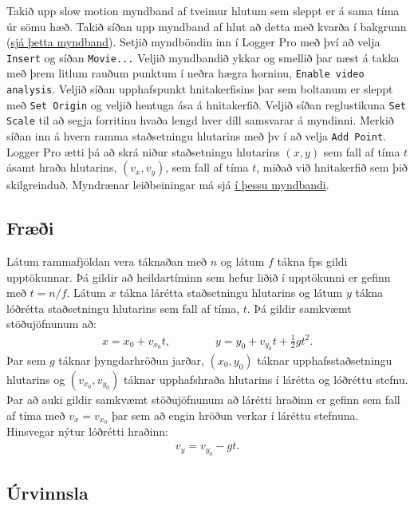 \documentclass[oneside]{book}
\theoremstyle{definition}
\begin{document}
Takið upp slow motion myndband af tveimur hlutum sem sleppt er á sama tíma úr sömu hæð. Takið síðan upp myndband af hlut að detta með kvarða í bakgrunn (\href{https://www.dropbox.com/s/k13yf25p9ocxt9y/IMG_0976.MOV?dl=1}{sjá þetta myndband}). Setjið myndböndin inn í Logger Pro með því að velja \verb|Insert| og síðan \verb|Movie...| 
Veljið myndbandið ykkar og smellið þar næst á takka með þrem litlum rauðum punktum í neðra hægra horninu, \verb|Enable video analysis|. Veljið síðan upphafspunkt hnitakerfisins þar sem boltanum er sleppt með \verb|Set Origin| og veljið hentuga ása á hnitakerfið. Veljið síðan reglustikuna \verb|Set Scale| til að segja forritinu hvaða lengd hver díll samsvarar á myndinni. Merkið síðan inn á hvern ramma staðsetningu hlutarins með þv
í að velja \verb|Add Point|. Logger Pro ætti þá að skrá niður staðsetningu hlutarins $(x,y)$ sem fall af tíma $t$ ásamt hraða hlutarins, $(v_x, v_y)$, sem fall af tíma $t$,  miðað við hnitakerfið sem þið skilgreinduð. Myndrænar leiðbeiningar má sjá \href{https://youtu.be/rwYJV8W5_64}{í þessu myndbandi}.


\subsection*{Fræði}

Látum rammafjöldan vera táknaðan með $n$ og látum $f$ tákna fps gildi upptökunnar. Þá gildir að heildartíminn sem hefur liðið í upptökunni er gefinn með $t = n/f$. Látum $x$ tákna lárétta staðsetningu hlutarins og látum $y$ tákna lóðrétta staðsetningu hlutarins sem fall af tíma, $t$. Þá gildir samkvæmt stöðujöfnunum að:
\begin{align}
    x = x_0 + v_{x_{0}}t, \qquad \qquad y = y_0 + v_{y_{0}} t + \frac{1}{2}gt^2.
\end{align}
Þar sem $g$ táknar þyngdarhröðun jarðar, $(x_0, y_0)$ táknar upphafsstaðsetningu hlutarins og $(v_{x_{0}},v_{y_{0}} )$ táknar upphafshraða hlutarins í lárétta og lóðréttu stefnu. Þar að auki gildir samkvæmt stöðujöfnunum að lárétti hraðinn er gefinn sem fall af tíma með $v_{x} = v_{x_0}$ þar sem að engin hröðun verkar í láréttu stefnuna. Hinsvegar nýtur lóðrétti hraðinn:
\begin{align}
  v_y =   v_{y_{0}} - gt.
\end{align}

\subsection*{Úrvinnsla}
\end{document}
